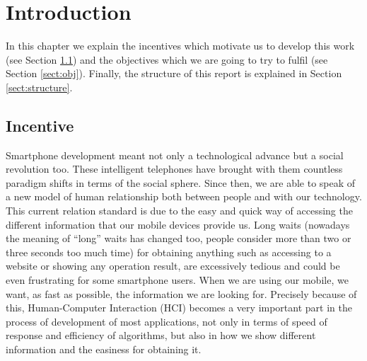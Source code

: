\chapter{Introduction}
\label{cap:introduccion}


In this chapter we explain the incentives which motivate us to develop this work (see Section \ref{sect:motiv}) and the objectives which we are going to try to fulfil (see Section \ref{sect:obj}). Finally, the structure of this report is explained in Section \ref{sect:structure}.

\section{Incentive}\label{sect:motiv}
Smartphone development meant not only a technological advance but a social revolution too. These intelligent telephones have brought with them countless paradigm shifts in terms of the social sphere. Since then, we are able to speak of a new model of human relationship both between people and with our technology. This current relation standard is due to the easy and quick way of accessing the different information that our mobile devices provide us. Long waits (nowadays the meaning of ``long'' waits has changed too, people consider more than two or three seconds too much time) for obtaining anything such as accessing to a website or showing any operation result, are excessively tedious and could be even frustrating for some smartphone users. When we are using our mobile, we want, as fast as possible, the information we are looking for. Precisely because of this, Human-Computer Interaction (HCI) becomes a very important part in the process of development of most applications, not only in terms of speed of response and efficiency of algorithms, but also in how we show different information and the easiness for obtaining it.

